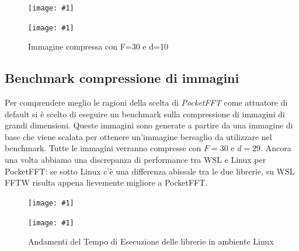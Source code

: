 \documentclass[a4paper,11pt,oneside, table]{article}
\newcommand{\putsubimage}[5] {
  \begin{minipage}{{#4}\linewidth}
	    \centering
      \texttt{[image: \#1]}
	    \caption{#2}\label{#3}
	\end{minipage}
}
\newcommand{\putimagecouple}[2] {
  \begin{figure}[!htb]
      \centering
      #1
      \hspace{0.5cm}
      #2
  \end{figure}
}
\begin{document}
\putimagecouple
  {\putsubimage{./images/compression-cl-F30-d50.png}{Immagine compressa con F=30 e d=50}{png:compression-cl-F30-d50}{0.45}{0.99}}
  {\putsubimage{./images/compression-cl-F30-d10.png}{Immagine compressa con F=30 e d=10}{png:compression-cl-F30-d10}{0.45}{0.99}}

\subsection{Benchmark compressione di immagini}

Per comprendere meglio le ragioni della scelta di \textit{PocketFFT} come attuatore di default si \`e scelto di eseguire un benchmark sulla compressione di immagini di grandi dimensioni.
Queste immagini sono generate a partire da una immagine di base che viene scalata per ottenere un'immagine bersaglio da utilizzare nel benchmark.
Tutte le immagini verranno compresse con $F=30$ e $d=29$.
Ancora una volta abbiamo una discrepanza di performance tra WSL e Linux per PocketFFT: se sotto Linux c'\`e una differenza abissale tra le due librerie, su WSL FFTW risulta appena lievemente migliore a PocketFFT.

\putimagecouple
  {\putsubimage{./images/benchmark-compression-wsl.png}{Andamenti del Tempo di Esecuzione delle librerie in ambiente WSL}{png:benchmark-compression-wsl}{0.45}{0.99}}
  {\putsubimage{./images/benchmark-compression-linux.png}{Andamenti del Tempo di Esecuzione delle librerie in ambiente Linux}{png:benchmark-compression-linux}{0.45}{0.99}}

\printbibliography[title={Bibliografia}]
\end{document}
